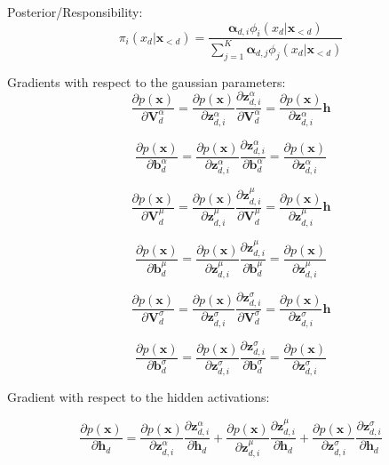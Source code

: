 \documentclass{article} %
\begin{document}
Posterior/Responsibility:
$$ \pi_{i}(x_d|\mathbf{x}_{<d}) = \frac{\boldsymbol{\alpha}_{d,i} \phi_i(x_d| \mathbf{x}_{<d})}{\sum_{j=1}^K \boldsymbol{\alpha}_{d,j} \phi_j(x_d| \mathbf{x}_{<d})}$$

Gradients with respect to the gaussian parameters:
$$ \frac{\partial p(\mathbf{x})}{\partial \mathbf{V}_{d}^{\alpha}} = \frac{\partial p(\mathbf{x})}{\partial \mathbf{z}_{d,i}^{\alpha}} \frac{\partial \mathbf{z}_{d,i}^{\alpha}}{\partial \mathbf{V}_{d}^{\alpha}} = \frac{\partial p(\mathbf{x})}{\partial \mathbf{z}_{d,i}^{\alpha}} \mathbf{h}$$

$$ \frac{\partial p(\mathbf{x})}{\partial \mathbf{b}_{d}^{\alpha}} = \frac{\partial p(\mathbf{x})}{\partial \mathbf{z}_{d,i}^{\alpha}} \frac{\partial \mathbf{z}_{d,i}^{\alpha}}{\partial \mathbf{b}_{d}^{\alpha}} = \frac{\partial p(\mathbf{x})}{\partial \mathbf{z}_{d,i}^{\alpha}}$$

$$ \frac{\partial p(\mathbf{x})}{\partial \mathbf{V}_{d}^{\mu}} = \frac{\partial p(\mathbf{x})}{\partial \mathbf{z}_{d,i}^{\mu}} \frac{\partial \mathbf{z}_{d,i}^{\mu}}{\partial \mathbf{V}_{d}^{\mu}} = \frac{\partial p(\mathbf{x})}{\partial \mathbf{z}_{d,i}^{\mu}} \mathbf{h}$$

$$ \frac{\partial p(\mathbf{x})}{\partial \mathbf{b}_{d}^{\mu}} = \frac{\partial p(\mathbf{x})}{\partial \mathbf{z}_{d,i}^{\mu}} \frac{\partial \mathbf{z}_{d,i}^{\mu}}{\partial \mathbf{b}_{d}^{\mu}} = \frac{\partial p(\mathbf{x})}{\partial \mathbf{z}_{d,i}^{\mu}}$$

$$ \frac{\partial p(\mathbf{x})}{\partial \mathbf{V}_{d}^{\sigma}} = \frac{\partial p(\mathbf{x})}{\partial \mathbf{z}_{d,i}^{\sigma}} \frac{\partial \mathbf{z}_{d,i}^{\sigma}}{\partial \mathbf{V}_{d}^{\sigma}} = \frac{\partial p(\mathbf{x})}{\partial \mathbf{z}_{d,i}^{\sigma}} \mathbf{h}$$

$$ \frac{\partial p(\mathbf{x})}{\partial \mathbf{b}_{d}^{\sigma}} = \frac{\partial p(\mathbf{x})}{\partial \mathbf{z}_{d,i}^{\sigma}} \frac{\partial \mathbf{z}_{d,i}^{\sigma}}{\partial \mathbf{b}_{d}^{\sigma}} = \frac{\partial p(\mathbf{x})}{\partial \mathbf{z}_{d,i}^{\sigma}}$$

Gradient with respect to the hidden activations:

$$\frac{\partial p(\mathbf{x})}{\partial \mathbf{h}_d} = \frac{\partial p(\mathbf{x})}{\partial \mathbf{z}_{d,i}^{\alpha}} \frac{\partial \mathbf{z}_{d,i}^{\alpha}}{\partial \mathbf{h}_{d}} + \frac{\partial p(\mathbf{x})}{\partial \mathbf{z}_{d,i}^{\mu}} \frac{\partial \mathbf{z}_{d,i}^{\mu}}{\partial \mathbf{h}_{d}} + \frac{\partial p(\mathbf{x})}{\partial \mathbf{z}_{d,i}^{\sigma}} \frac{\partial \mathbf{z}_{d,i}^{\sigma}}{\partial \mathbf{h}_{d}}$$
\end{document}
